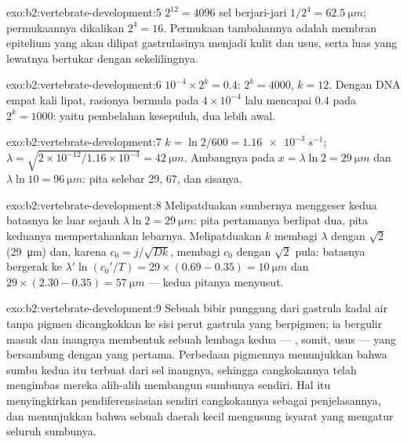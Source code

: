\begin{solution}{exo:b2:vertebrate-development:5}
$2^{12} = 4096$ sel berjari-jari $1/2^{4} = \qty{62.5}{\micro m}$;
permukaannya dikalikan $2^{4} = 16$. Permukaan tambahannya adalah
membran epitelium yang akan dilipat gastrulasinya menjadi kulit dan
usus, serta luas yang lewatnya  bertukar dengan
sekelilingnya.
\end{solution}

\begin{solution}{exo:b2:vertebrate-development:6}
$10^{-4}\times 2^{k} = 0.4$: $2^{k} = 4000$, $k = 12$. Dengan DNA empat
kali lipat, rasionya bermula pada $4\times 10^{-4}$ lalu mencapai $0.4$
pada $2^{k} = 1000$: yaitu pembelahan kesepuluh, dua lebih awal.
\end{solution}

\begin{solution}{exo:b2:vertebrate-development:7}
$k = \ln 2/600 = \qty{1.16e-3}{s^{-1}}$; $\lambda = \sqrt{2\times
10^{-12}/1.16\times 10^{-3}} = \qty{42}{\micro m}$. Ambangnya pada
$x = \lambda\ln 2 = \qty{29}{\micro m}$ dan $\lambda\ln 10 =
\qty{96}{\micro m}$: pita selebar 29, 67, dan sisanya.
\end{solution}

\begin{solution}{exo:b2:vertebrate-development:8}
Melipatduakan sumbernya menggeser kedua batasnya ke luar sejauh
$\lambda\ln
2 = \qty{29}{\micro m}$: pita pertamanya berlipat dua, pita
keduanya mempertahankan lebarnya. Melipatduakan $k$ membagi $\lambda$
dengan $\sqrt 2$ (\qty{29}{\micro m}) dan, karena $c_0 = j/\sqrt{Dk}$,
membagi $c_0$ dengan $\sqrt 2$ pula: batasnya bergerak ke
$\lambda'\ln(c_0'/T) =
29\times(0.69 - 0.35) = \qty{10}{\micro m}$ dan
$29\times(2.30 -
0.35) = \qty{57}{\micro m}$ --- kedua pitanya menyusut.
\end{solution}

\begin{solution}{exo:b2:vertebrate-development:9}
Sebuah bibir punggung dari gastrula kadal air tanpa pigmen dicangkokkan
ke sisi perut gastrula yang berpigmen; ia bergulir masuk dan inangnya
membentuk sebuah lembaga kedua --- , somit, usus --- yang
bersambung dengan yang pertama. Perbedaan pigmennya menunjukkan bahwa
sumbu kedua itu terbuat dari sel inangnya, sehingga cangkokannya telah
mengimbas mereka alih-alih membangun sumbunya sendiri. Hal itu
menyingkirkan pendiferensiasian sendiri cangkokannya sebagai
penjelasannya, dan menunjukkan bahwa sebuah daerah kecil mengusung
isyarat yang mengatur seluruh sumbunya.
\end{solution}

